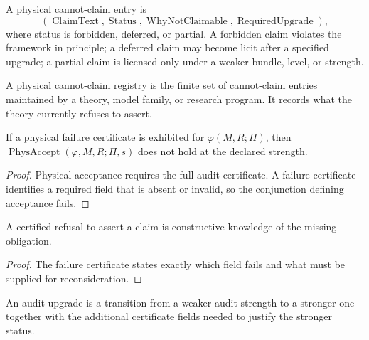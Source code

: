 \begin{definition}
\label{def:physical-cannot-claim-entry}
A physical cannot-claim entry is
$$
(\operatorname{ClaimText},
\operatorname{Status},
\operatorname{WhyNotClaimable},
\operatorname{RequiredUpgrade}),
$$
where status is forbidden, deferred, or partial. A forbidden claim violates the framework in principle; a deferred claim may become licit after a specified upgrade; a partial claim is licensed only under a weaker bundle, level, or strength.
\end{definition}

\begin{definition}
\label{def:physical-cannot-claim-registry}
A physical cannot-claim registry is the finite set of cannot-claim entries maintained by a theory, model family, or research program. It records what the theory currently refuses to assert.
\end{definition}

\begin{theorem}
\label{thm:failure-certificates-block-acceptance}
If a physical failure certificate is exhibited for $\varphi(M,R;\Pi)$, then $\operatorname{PhysAccept}(\varphi,M,R;\Pi,s)$ does not hold at the declared strength.
\end{theorem}

\begin{proof}
Physical acceptance requires the full audit certificate. A failure certificate identifies a required field that is absent or invalid, so the conjunction defining acceptance fails.
\end{proof}

\begin{corollary}
\label{cor:negative-knowledge-constructive-audit}
A certified refusal to assert a claim is constructive knowledge of the missing obligation.
\end{corollary}

\begin{proof}
The failure certificate states exactly which field fails and what must be supplied for reconsideration.
\end{proof}

\begin{definition}
\label{def:audit-upgrade}
An audit upgrade is a transition from a weaker audit strength to a stronger one together with the additional certificate fields needed to justify the stronger status.
\end{definition}

